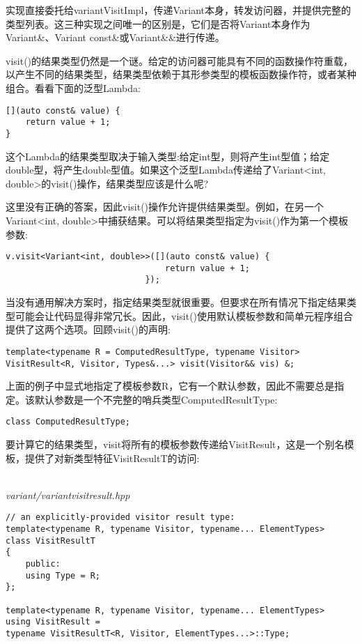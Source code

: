 实现直接委托给variantVisitImpl，传递Variant本身，转发访问器，并提供完整的类型列表。这三种实现之间唯一的区别是，它们是否将Variant本身作为Variant\&、Variant const\&或Variant\&\&进行传递。


visit()的结果类型仍然是一个谜。给定的访问器可能具有不同的函数操作符重载，以产生不同的结果类型，结果类型依赖于其形参类型的模板函数操作符，或者某种组合。看看下面的泛型Lambda:

\begin{lstlisting}[style=styleCXX]
[](auto const& value) {
	return value + 1;
}
\end{lstlisting}

这个Lambda的结果类型取决于输入类型:给定int型，则将产生int型值；给定double型，将产生double型值。如果这个泛型Lambda传递给了Variant<int, double>的visit()操作，结果类型应该是什么呢?

这里没有正确的答案，因此visit()操作允许提供结果类型。例如，在另一个Variant<int, double>中捕获结果。可以将结果类型指定为visit()作为第一个模板参数:

\begin{lstlisting}[style=styleCXX]
v.visit<Variant<int, double>>([](auto const& value) {
								return value + 1;
							});
\end{lstlisting}

当没有通用解决方案时，指定结果类型就很重要。但要求在所有情况下指定结果类型可能会让代码显得非常冗长。因此，visit()使用默认模板参数和简单元程序组合提供了这两个选项。回顾visit()的声明:

\begin{lstlisting}[style=styleCXX]
template<typename R = ComputedResultType, typename Visitor>
VisitResult<R, Visitor, Types&...> visit(Visitor&& vis) &;
\end{lstlisting}

上面的例子中显式地指定了模板参数R，它有一个默认参数，因此不需要总是指定。该默认参数是一个不完整的哨兵类型ComputedResultType:

\begin{lstlisting}[style=styleCXX]
class ComputedResultType;
\end{lstlisting}

要计算它的结果类型，visit将所有的模板参数传递给VisitResult，这是一个别名模板，提供了对新类型特征VisitResultT的访问:

\hspace*{\fill} \\ %
\noindent
\textit{variant/variantvisitresult.hpp}
\begin{lstlisting}[style=styleCXX]
// an explicitly-provided visitor result type:
template<typename R, typename Visitor, typename... ElementTypes>
class VisitResultT
{
	public:
	using Type = R;
};

template<typename R, typename Visitor, typename... ElementTypes>
using VisitResult =
typename VisitResultT<R, Visitor, ElementTypes...>::Type;
\end{lstlisting}

